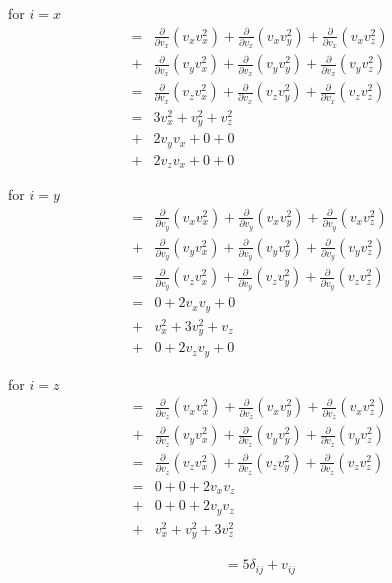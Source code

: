 \documentclass[paper=a4, fontsize=12pt]{scrartcl}
\begin{document}
for $i = x $
\begin{align*}
=&
 \frac{\partial}{\partial v_x}(v_x v_x^2)
+\frac{\partial}{\partial v_x}(v_x v_y^2)
+\frac{\partial}{\partial v_x}(v_x v_z^2)\\
+& 
 \frac{\partial}{\partial v_x}(v_y v_x^2)
+\frac{\partial}{\partial v_x}(v_y v_y^2)
+\frac{\partial}{\partial v_x}(v_y v_z^2)\\
=&
 \frac{\partial}{\partial v_x}(v_z v_x^2)
+\frac{\partial}{\partial v_x}(v_z v_y^2)
+\frac{\partial}{\partial v_x}(v_z v_z^2)\\
=&
	3 v_x^2 + v_y^2 + v_z^2\\
+&  2 v_y v_x + 0 + 0 \\
+&  2v_zv_x + 0 + 0 
\end{align*}	

for $i = y $
\begin{align*}
=&
 \frac{\partial}{\partial v_y}(v_x v_x^2)
+\frac{\partial}{\partial v_y}(v_x v_y^2)
+\frac{\partial}{\partial v_y}(v_x v_z^2)\\
+& 
 \frac{\partial}{\partial v_y}(v_y v_x^2)
+\frac{\partial}{\partial v_y}(v_y v_y^2)
+\frac{\partial}{\partial v_y}(v_y v_z^2)\\
=&
 \frac{\partial}{\partial v_y}(v_z v_x^2)
+\frac{\partial}{\partial v_y}(v_z v_y^2)
+\frac{\partial}{\partial v_y}(v_z v_z^2)\\
=&
     0 + 2v_xv_y + 0\\
+&   v_x^2 + 3v_y^2 + v_z \\
+&   0 + 2v_zv_y + 0 
\end{align*}	

for $i = z $
\begin{align*}
=&
 \frac{\partial}{\partial v_z}(v_x v_x^2)
+\frac{\partial}{\partial v_z}(v_x v_y^2)
+\frac{\partial}{\partial v_z}(v_x v_z^2)\\
+& 
 \frac{\partial}{\partial v_z}(v_y v_x^2)
+\frac{\partial}{\partial v_z}(v_y v_y^2)
+\frac{\partial}{\partial v_z}(v_y v_z^2)\\
=&
 \frac{\partial}{\partial v_z}(v_z v_x^2)
+\frac{\partial}{\partial v_z}(v_z v_y^2)
+\frac{\partial}{\partial v_z}(v_z v_z^2)\\
=&
0 + 0 + 2v_xv_z\\
+&   0 + 0 + 2v_yv_z \\
+&   v_x^2 + v_y^2 + 3v_z^2 
\end{align*}	

\begin{align*}
= 5 \delta_{ij} + v_{ij}
\end{align*}
\end{document}
